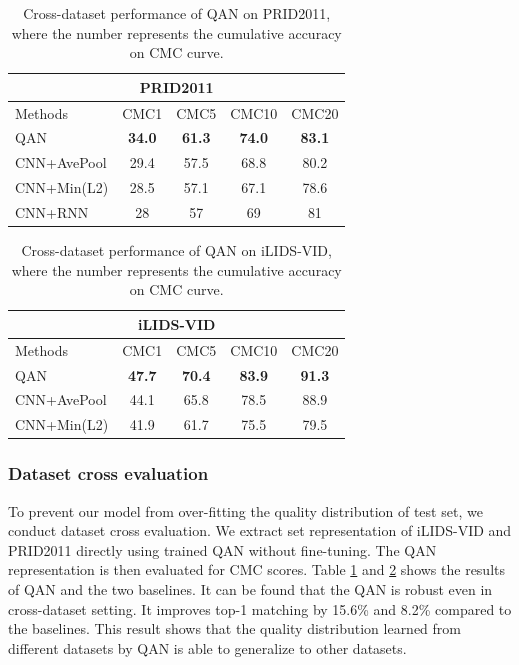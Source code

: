 \begin{table}[ht]
\normalsize
  \centering
  \begin{tabular}{l|c|c|c|c}
    \hline
      \multicolumn{5}{c}{PRID2011}\\
    \hline
       Methods & CMC1 &CMC5&CMC10 & CMC20  \\
    \hline
       QAN 		  & \bf{34.0} & \bf{61.3} & \bf{74.0} & \bf{83.1}  \\
       CNN+AvePool 		& 29.4 & 57.5 & 68.8 & 80.2  \\
       CNN+Min(L2) 		& 28.5 & 57.1 & 67.1 & 78.6  \\
    \hline
    CNN+RNN\cite{wu2016deep} & 28 & 57 & 69 & 81 \\
    \hline
  \end{tabular}
  \caption{Cross-dataset performance of QAN on PRID2011, where the number represents the cumulative accuracy on CMC curve.}
  \label{tab_cross_prid}
\end{table}

\begin{table}[ht]
\normalsize
  \centering
  \begin{tabular}{l|c|c|c|c}
    \hline
      \multicolumn{5}{c}{iLIDS-VID}\\
    \hline
       Methods & CMC1 &CMC5&CMC10 & CMC20  \\
    \hline
       QAN		& \bf{47.7} & \bf{70.4} & \bf{83.9} & \bf{91.3} \\
       CNN+AvePool 		& 44.1 & 65.8 & 78.5 & 88.9 \\
       CNN+Min(L2) 		& 41.9 & 61.7 & 75.5 & 79.5  \\
    \hline
  \end{tabular}
  \caption{Cross-dataset performance of QAN on iLIDS-VID, where the number represents the cumulative accuracy on CMC curve.}
  \label{tab_cross_ilids}
\end{table}

\subsubsection{Dataset cross evaluation} To prevent our model from over-fitting the quality distribution of test set, we conduct dataset cross evaluation. We extract set representation of iLIDS-VID and PRID2011 directly using trained QAN without fine-tuning. The QAN representation is then evaluated for CMC scores. Table \ref{tab_cross_prid} and \ref{tab_cross_ilids} shows the results of QAN and the two baselines. It can be found that the QAN is robust even in cross-dataset setting. It improves top-1 matching by 15.6\% and 8.2\% compared to the baselines. This result shows that the quality distribution learned from different datasets by QAN is able to generalize to other datasets.



